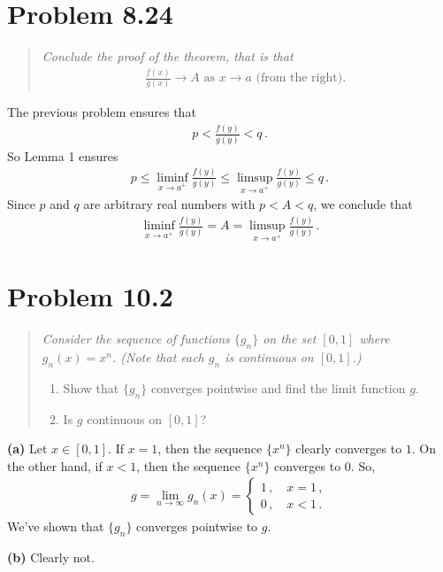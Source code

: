 \documentclass{article}
\begin{document}
\section*{Problem 8.24}

\begin{quote}
    \itshape
    Conclude the proof of the theorem, that is that
    \begin{align*}
        \frac{f(x)}{g(x)} \to A \text{ as } x \to a \text{ (from the right). }
    \end{align*}
\end{quote}

The previous problem ensures that
\begin{align*}
    p < \frac{f(y)}{g(y)} < q \,.
\end{align*}
So Lemma 1 ensures
\begin{align*}
    p \leq \liminf_{x \to a^+} \frac{f(y)}{g(y)} \leq \limsup_{x \to a^+} \frac{f(y)}{g(y)} \leq q \,.
\end{align*}
Since $p$ and $q$ are arbitrary real numbers with $p < A < q$, we conclude that
\begin{align*}
    \liminf_{x \to a^+} \frac{f(y)}{g(y)} = A =  \limsup_{x \to a^+} \frac{f(y)}{g(y)} \,.
\end{align*}
\qedsymbol

\section*{Problem 10.2}

\begin{quote}
    \itshape
    Consider the sequence of functions $\{ g_n \}$ on the set
    $[0,1]$ where $g_n(x) = x^n$. (Note that each $g_n$ is continuous
    on $[0,1]$.)

    \begin{enumerate}[label=(\alph*)]
        \item Show that $\{g_n\}$ converges pointwise and find the limit
        function $g$.
        \item Is $g$ continuous on $[0,1]$?
    \end{enumerate}
\end{quote}

\textbf{(a)} Let $x \in [0,1]$.
If $x = 1$, then the sequence $\{x^n\}$ clearly converges to $1$.
On the other hand, if $x < 1$, then the sequence
$\{x^n\}$ converges to $0$. So,
\begin{align*}
    g = \lim_{n\to\infty} g_n(x) = \begin{cases}
        1 \,, \quad x = 1 \,, \\
        0 \,, \quad x < 1 \,.
    \end{cases}
\end{align*}
We've shown that $\{g_n\}$ converges pointwise to $g$.

\textbf{(b)} Clearly not.
\end{document}
